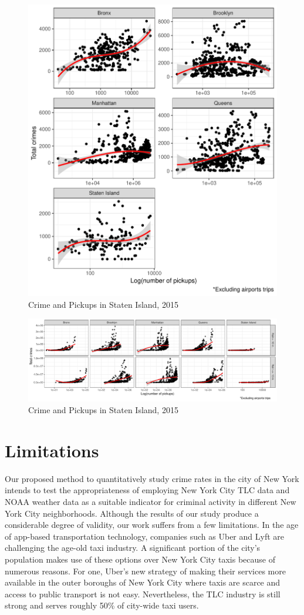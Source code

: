 \documentclass{sigkddExp}
\begin{document}
\begin{figure}
    \centering
    \includegraphics[width=.5\textwidth]{../img/scatter_crimes_taxis.pdf}
    \caption{Crime and Pickups in Staten Island, 2015}
    \label{Staten Island}
  \end{figure}


\begin{figure}
    \centering
    \includegraphics[width=1\textwidth]{../img/scatter_crimes_taxis_rain.pdf}
    \caption{Crime and Pickups in Staten Island, 2015}
    \label{Staten Island}
\end{figure}


\section{Limitations}
Our proposed method to quantitatively study crime rates in the city of New York intends to test the appropriateness of employing New York City TLC data and NOAA weather data as a suitable indicator for criminal activity in different New York City neighborhoods. Although the results of our study produce a considerable degree of validity, our work suffers from a few limitations. 
In the age of app-based transportation technology, companies such as Uber and Lyft are challenging the age-old taxi industry. 
A significant portion of the city's population makes use of these options over New York City taxis because of numerous reasons. 
For one, Uber's new strategy of making their services more available in the outer boroughs of New York City where taxis are scarce and access to public transport is not easy. Nevertheless, the TLC industry is still strong and serves roughly 50\% of city-wide taxi users.
\end{document}
